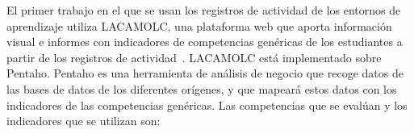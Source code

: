 
El primer trabajo en el que se usan los registros de actividad de los entornos de aprendizaje utiliza LACAMOLC, una plataforma web que aporta información visual e informes con indicadores de competencias genéricas de los estudiantes a partir de los registros de actividad~\cite{rayon2014web}. LACAMOLC está implementado sobre Pentaho. Pentaho es una herramienta de análisis de negocio que recoge datos de las bases de datos de los diferentes orígenes, y que mapeará estos datos con los indicadores de las competencias genéricas. Las competencias que se evalúan y los indicadores que se utilizan son:

